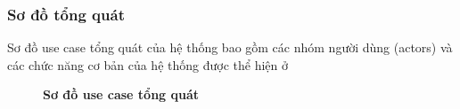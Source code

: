 \subsubsection{Sơ đồ tổng quát}
Sơ đồ use case tổng quát của hệ thống bao gồm các nhóm người dùng (actors) và các chức năng cơ bản của hệ thống được thể hiện ở 

\begin{figure}[H]
  \centering
  
  \caption{\bfseries Sơ đồ use case tổng quát}
  \label{fig:c2p1general}
\end{figure}
